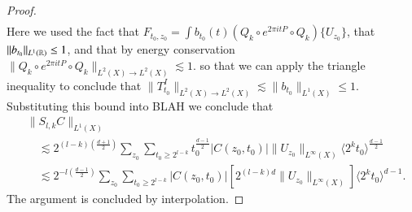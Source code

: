 \begin{proof}
\begin{align*}
    \end{align*}
    Here we used the fact that $F_{t_0,z_0} = \int b_{t_0}(t) ( Q_k \circ e^{2 \pi i t P} \circ Q_k ) \{ U_{z_0} \}$, that $\| b_{t_0} \|_{L^1(\operatorname{\mathbb{R}})} \leq 1$,  and that by energy conservation $\| Q_k \circ e^{2 \pi i t P} \circ Q_k \|_{L^2(X) \to L^2(X)} \lesssim 1$. so that we can apply the triangle inequality to conclude that $\| T_{t_0}^I \|_{L^2(X) \to L^2(X)} \lesssim \| b_{t_0} \|_{L^1(X)} \leq 1$. Substituting this bound into BLAH we conclude that
    \begin{align*}
        &\| S_{l,k} C \|_{L^1(X)}\\
        &\quad \lesssim 2^{(l-k) \left( \frac{d+1}{2}\right)} \sum\nolimits_{z_0} \sum\nolimits_{t_0 \geq 2^{l-k}} t_0^{\frac{d-1}{2}} |C(z_0,t_0)| \| U_{z_0} \|_{L^\infty(X)} \langle 2^k t_0 \rangle^{\frac{d-1}{2}}\\
        &\quad \lesssim 2^{-l \left( \frac{d-1}{2} \right)} \sum\nolimits_{z_0} \sum\nolimits_{t_0 \geq 2^{l-k}} |C(z_0,t_0)| \left[  2^{(l-k)d} \| U_{z_0} \|_{L^\infty(X)}\right] \langle 2^k t_0 \rangle^{d-1}.
    \end{align*}
    The argument is concluded by interpolation.
\end{proof}

